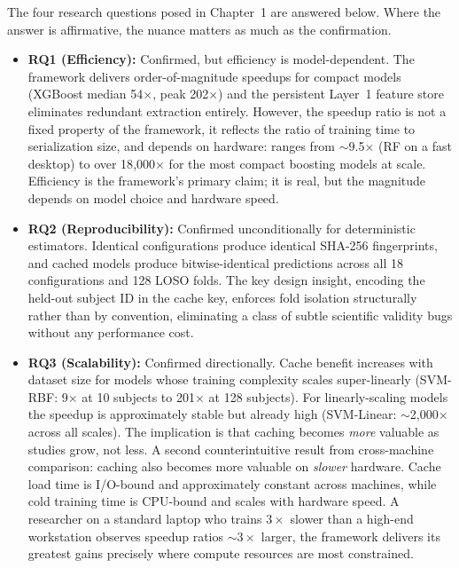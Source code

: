 The four research questions posed in Chapter~1 are answered below. Where the
answer is affirmative, the nuance matters as much as the confirmation.

\begin{itemize}
\item \textbf{RQ1 (Efficiency):} Confirmed, but efficiency is model-dependent.
 The framework delivers order-of-magnitude speedups for compact models
 (XGBoost median 54$\times$, peak 202$\times$) and the persistent
 Layer~1 feature store eliminates redundant extraction entirely. However,
 the speedup ratio is not a fixed property of the framework, it
 reflects the ratio of training time to serialization size, and depends
 on hardware: ranges from $\sim$9.5$\times$ (RF on a fast desktop) to
 over 18{,}000$\times$ for the most compact boosting models at scale.
 Efficiency is the framework's primary claim; it is real, but the
 magnitude depends on model choice and hardware speed.

\item \textbf{RQ2 (Reproducibility):} Confirmed unconditionally for
 deterministic estimators. Identical configurations produce identical
 SHA-256 fingerprints, and cached models produce bitwise-identical
 predictions across all 18 configurations and 128 LOSO folds. The
 key design insight, encoding the held-out subject ID in the cache
 key, enforces fold isolation structurally rather than by convention,
 eliminating a class of subtle scientific validity bugs without any
 performance cost.

\item \textbf{RQ3 (Scalability):} Confirmed directionally. Cache benefit
 increases with dataset size for models whose training complexity scales
 super-linearly (SVM-RBF: 9$\times$ at 10 subjects to 201$\times$ at 128
 subjects). For linearly-scaling models the speedup is approximately
 stable but already high (SVM-Linear: $\sim$2{,}000$\times$ across all
 scales). The implication is that caching becomes \textit{more} valuable
 as studies grow, not less. A second counterintuitive result from
 cross-machine comparison: caching also becomes more valuable on
 \textit{slower} hardware. Cache load time is I/O-bound and approximately
 constant across machines, while cold training time is CPU-bound and
 scales with hardware speed. A researcher on a standard laptop who trains
 $3\times$ slower than a high-end workstation observes speedup ratios
 $\sim$$3\times$ larger, the framework delivers its greatest gains
 precisely where compute resources are most constrained.


\end{itemize}
